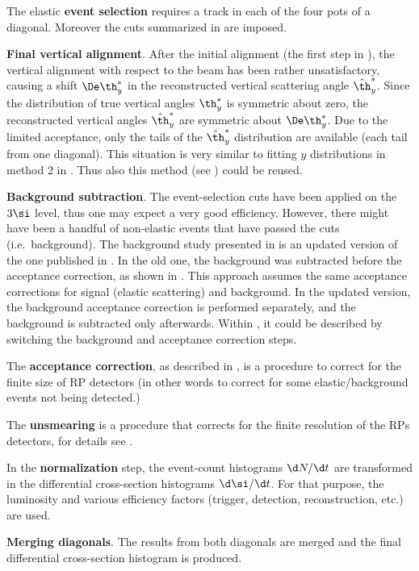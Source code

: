 \> The elastic {\bf event selection} requires a track in each of the four pots of a diagonal. Moreover the cuts summarized in  are imposed.

\> {\bf Final vertical alignment}. After the initial alignment (the first step in ), the vertical alignment with respect to the beam has been rather unsatisfactory, causing a shift $\De\th_y^*$ in the reconstructed vertical scattering angle $\hat \th_y^*$. Since the distribution of true vertical angles $\th_y^*$ is symmetric about zero, the reconstructed vertical angles $\hat\th_y^*$ are symmetric about $\De\th_y^*$. Due to the limited acceptance, only the tails of the $\hat\th_y^*$ distribution are available (each tail from one diagonal). This situation is very similar to fitting $y$ distributions in method 2 in . Thus also this method (see ) could be reused.

\> {\bf Background subtraction}. The event-selection cuts have been applied on the $3\si$ level, thus one may expect a very good efficiency. However, there might have been a handful of non-elastic events that have passed the cuts (i.e.~background). The background study presented in  is an updated version of the one published in . In the old one, the background was subtracted before the acceptance correction, as shown in . This approach assumes the same acceptance corrections for signal (elastic scattering) and background. In the updated version, the background acceptance correction is performed separately, and the background is subtracted only afterwards. Within , it could be described by switching the background and acceptance correction steps.

\> The {\bf acceptance correction}, as described in , is a procedure to correct for the finite size of RP detectors (in other words to correct for some elastic/background events not being detected.)

\> The {\bf unsmearing} is a procedure that corrects for the finite resolution of the RPs detectors, for details see .

\> In the {\bf normalization} step, the event-count histograms $\d N/\d t$ are transformed in the differential cross-section histograms $\d\si/\d t$. For that purpose, the luminosity and various efficiency factors (trigger, detection, reconstruction, etc.) are used.

\> {\bf Merging diagonals}. The results from both diagonals are merged and the final differential cross-section histogram is produced.





